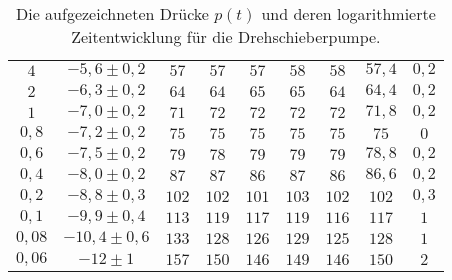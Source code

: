 \begin{table}
\begin{center}
\begin{tabular}{cc|ccccc|cc}
			$4$           &                   $-5,6\pm 0,2$                    &         $57$          &         $57$          &         $57$          &         $58$          &         $58$          &          $57,4$           &           $0,2$            \\
			$2$           &                   $-6,3\pm 0,2$                    &         $64$          &         $64$          &         $65$          &         $65$          &         $64$          &          $64,4$           &           $0,2$            \\
			$1$           &                   $-7,0\pm 0,2$                    &         $71$          &         $72$          &         $72$          &         $72$          &         $72$          &          $71,8$           &           $0,2$            \\
			$0,8$          &                   $-7,2\pm 0,2$                    &         $75$          &         $75$          &         $75$          &         $75$          &         $75$          &           $75$            &            $0$             \\
			$0,6$          &                   $-7,5\pm 0,2$                    &         $79$          &         $78$          &         $79$          &         $79$          &         $79$          &          $78,8$           &           $0,2$            \\
			$0,4$          &                   $-8,0\pm 0,2$                    &         $87$          &         $87$          &         $86$          &         $87$          &         $86$          &          $86,6$           &           $0,2$            \\
			$0,2$          &                   $-8,8\pm 0,3$                    &         $102$         &         $102$         &         $101$         &         $103$         &         $102$         &           $102$           &           $0,3$            \\
			$0,1$          &                   $-9,9\pm 0,4$                    &         $113$         &         $119$         &         $117$         &         $119$         &         $116$         &           $117$           &            $1$             \\
			$0,08$          &                   $-10,4\pm 0,6$                   &         $133$         &         $128$         &         $126$         &         $129$         &         $125$         &           $128$           &            $1$             \\
			$0,06$          &                   $-12\pm 1$                   &         $157$         &         $150$         &         $146$         &         $149$         &         $146$         &           $150$           &            $2$             \\ \bottomrule
		\end{tabular}
		\caption{Die aufgezeichneten Drücke $p(t)$ und deren logarithmierte Zeitentwicklung für die Drehschieberpumpe.}
		\label{tab:tab2}
	\end{center}
\end{table}


